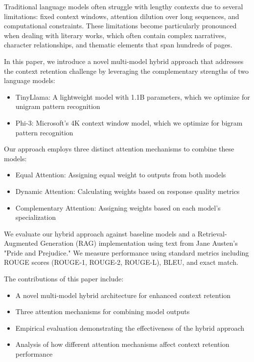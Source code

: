 \documentclass[conference]{IEEEtran}
\begin{document}
Traditional language models often struggle with lengthy contexts due to several limitations: fixed context windows, attention dilution over long sequences, and computational constraints. These limitations become particularly pronounced when dealing with literary works, which often contain complex narratives, character relationships, and thematic elements that span hundreds of pages.

In this paper, we introduce a novel multi-model hybrid approach that addresses the context retention challenge by leveraging the complementary strengths of two language models:
\begin{itemize}
    \item TinyLlama: A lightweight model with 1.1B parameters, which we optimize for unigram pattern recognition
    \item Phi-3: Microsoft's 4K context window model, which we optimize for bigram pattern recognition
\end{itemize}

Our approach employs three distinct attention mechanisms to combine these models:
\begin{itemize}
    \item Equal Attention: Assigning equal weight to outputs from both models
    \item Dynamic Attention: Calculating weights based on response quality metrics
    \item Complementary Attention: Assigning weights based on each model's specialization
\end{itemize}

We evaluate our hybrid approach against baseline models and a Retrieval-Augmented Generation (RAG) implementation using text from Jane Austen's "Pride and Prejudice." We measure performance using standard metrics including ROUGE scores (ROUGE-1, ROUGE-2, ROUGE-L), BLEU, and exact match.

The contributions of this paper include:
\begin{itemize}
    \item A novel multi-model hybrid architecture for enhanced context retention
    \item Three attention mechanisms for combining model outputs
    \item Empirical evaluation demonstrating the effectiveness of the hybrid approach
    \item Analysis of how different attention mechanisms affect context retention performance
\end{itemize}
\end{document}
